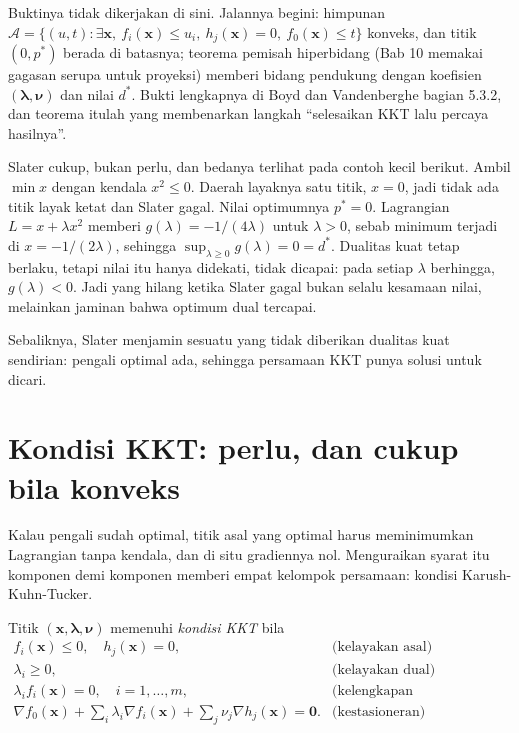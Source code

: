 Buktinya tidak dikerjakan di sini. Jalannya begini: himpunan
$\mathcal{A}=\{(u,t):\exists\mathbf{x},\ f_{i}(\mathbf{x})\le u_{i},\
h_{j}(\mathbf{x})=0,\ f_{0}(\mathbf{x})\le t\}$ konveks, dan titik $(0,p^{*})$ berada di
batasnya; teorema pemisah hiperbidang (Bab 10 memakai gagasan serupa untuk proyeksi)
memberi bidang pendukung dengan koefisien $(\boldsymbol{\lambda},\boldsymbol{\nu})$ dan
nilai $d^{*}$. Bukti lengkapnya di Boyd dan Vandenberghe bagian 5.3.2, dan teorema itulah
yang membenarkan langkah ``selesaikan KKT lalu percaya hasilnya''.

Slater cukup, bukan perlu, dan bedanya terlihat pada contoh kecil berikut. Ambil
$\min x$ dengan kendala $x^{2}\le0$. Daerah layaknya satu titik, $x=0$, jadi tidak ada
titik layak ketat dan Slater gagal. Nilai optimumnya $p^{*}=0$. Lagrangian
$L=x+\lambda x^{2}$ memberi $g(\lambda)=-1/(4\lambda)$ untuk $\lambda>0$, sebab minimum
terjadi di $x=-1/(2\lambda)$, sehingga $\sup_{\lambda\ge0}g(\lambda)=0=d^{*}$. Dualitas
kuat tetap berlaku, tetapi nilai itu hanya didekati, tidak dicapai: pada setiap
$\lambda$ berhingga, $g(\lambda)<0$. Jadi yang hilang ketika Slater gagal bukan selalu
kesamaan nilai, melainkan jaminan bahwa optimum dual tercapai.

Sebaliknya, Slater menjamin sesuatu yang tidak diberikan dualitas kuat sendirian: pengali
optimal ada, sehingga persamaan KKT punya solusi untuk dicari.

\section{Kondisi KKT: perlu, dan cukup bila konveks}

Kalau pengali sudah optimal, titik asal yang optimal harus meminimumkan Lagrangian tanpa
kendala, dan di situ gradiennya nol. Menguraikan syarat itu komponen demi komponen
memberi empat kelompok persamaan: kondisi Karush-Kuhn-Tucker.


\begin{definisi}
Titik $(\mathbf{x},\boldsymbol{\lambda},\boldsymbol{\nu})$ memenuhi \emph{kondisi KKT}
bila
\[
  \begin{array}{ll}
  f_{i}(\mathbf{x})\le0,\quad h_{j}(\mathbf{x})=0, & \text{(kelayakan asal)}\\
  \lambda_{i}\ge0, & \text{(kelayakan dual)}\\
  \lambda_{i}f_{i}(\mathbf{x})=0,\quad i=1,\dots,m, & \text{(kelengkapan komplementer)}\\
  \nabla f_{0}(\mathbf{x})+\sum_{i}\lambda_{i}\nabla f_{i}(\mathbf{x})
  +\sum_{j}\nu_{j}\nabla h_{j}(\mathbf{x})=\mathbf{0}. & \text{(kestasioneran)}
  \end{array}
\]
\end{definisi}

